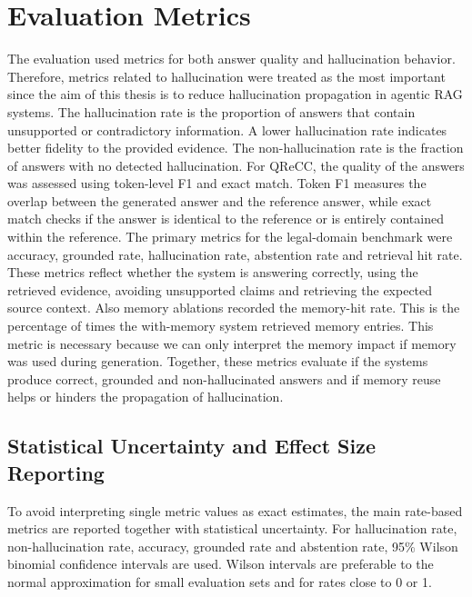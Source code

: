 
\section{Evaluation Metrics}
The evaluation used metrics for both answer quality and hallucination behavior. Therefore, metrics related to hallucination were treated as the most important since the aim of this thesis is to reduce hallucination propagation in agentic RAG systems.
The hallucination rate is the proportion of answers that contain unsupported or contradictory information. A lower hallucination rate indicates better fidelity to the provided evidence. The non-hallucination rate is the fraction of answers with no detected hallucination.
For QReCC, the quality of the answers was assessed using token-level F1 and exact match. Token F1 measures the overlap between the generated answer and the reference answer, while exact match checks if the answer is identical to the reference or is entirely contained within the reference.
The primary metrics for the legal-domain benchmark were accuracy, grounded rate, hallucination rate, abstention rate and retrieval hit rate. These metrics reflect whether the system is answering correctly, using the retrieved evidence, avoiding unsupported claims and retrieving the expected source context.
Also memory ablations recorded the memory-hit rate. This is the percentage of times the with-memory system retrieved memory entries. This metric is necessary because we can only interpret the memory impact if memory was used during generation.
Together, these metrics evaluate if the systems produce correct, grounded and non-hallucinated answers and if memory reuse helps or hinders the propagation of hallucination.

\subsection{Statistical Uncertainty and Effect Size Reporting}
To avoid interpreting single metric values as exact estimates, the main rate-based metrics are reported together with statistical uncertainty. For hallucination rate, non-hallucination rate, accuracy, grounded rate and abstention rate, 95\% Wilson binomial confidence intervals are used. Wilson intervals are preferable to the normal approximation for small evaluation sets and for rates close to 0 or 1.

